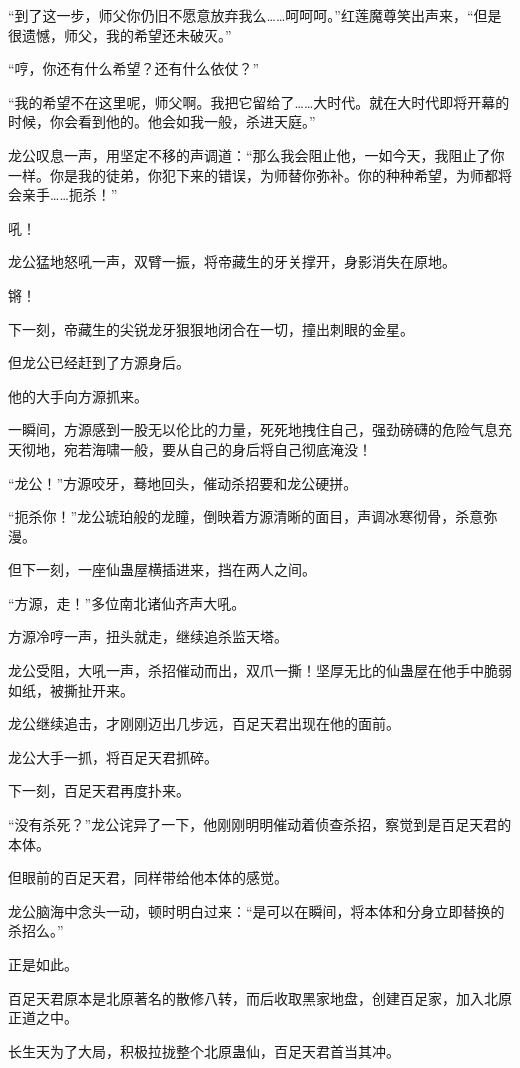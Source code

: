\begin{this_body}
“到了这一步，师父你仍旧不愿意放弃我么……呵呵呵。”红莲魔尊笑出声来，“但是很遗憾，师父，我的希望还未破灭。”

“哼，你还有什么希望？还有什么依仗？”

“我的希望不在这里呢，师父啊。我把它留给了……大时代。就在大时代即将开幕的时候，你会看到他的。他会如我一般，杀进天庭。”

龙公叹息一声，用坚定不移的声调道：“那么我会阻止他，一如今天，我阻止了你一样。你是我的徒弟，你犯下来的错误，为师替你弥补。你的种种希望，为师都将会亲手……扼杀！”

吼！

龙公猛地怒吼一声，双臂一振，将帝藏生的牙关撑开，身影消失在原地。

锵！

下一刻，帝藏生的尖锐龙牙狠狠地闭合在一切，撞出刺眼的金星。

但龙公已经赶到了方源身后。

他的大手向方源抓来。

一瞬间，方源感到一股无以伦比的力量，死死地拽住自己，强劲磅礴的危险气息充天彻地，宛若海啸一般，要从自己的身后将自己彻底淹没！

“龙公！”方源咬牙，蓦地回头，催动杀招要和龙公硬拼。

“扼杀你！”龙公琥珀般的龙瞳，倒映着方源清晰的面目，声调冰寒彻骨，杀意弥漫。

但下一刻，一座仙蛊屋横插进来，挡在两人之间。

“方源，走！”多位南北诸仙齐声大吼。

方源冷哼一声，扭头就走，继续追杀监天塔。

龙公受阻，大吼一声，杀招催动而出，双爪一撕！坚厚无比的仙蛊屋在他手中脆弱如纸，被撕扯开来。

龙公继续追击，才刚刚迈出几步远，百足天君出现在他的面前。

龙公大手一抓，将百足天君抓碎。

下一刻，百足天君再度扑来。

“没有杀死？”龙公诧异了一下，他刚刚明明催动着侦查杀招，察觉到是百足天君的本体。

但眼前的百足天君，同样带给他本体的感觉。

龙公脑海中念头一动，顿时明白过来：“是可以在瞬间，将本体和分身立即替换的杀招么。”

正是如此。

百足天君原本是北原著名的散修八转，而后收取黑家地盘，创建百足家，加入北原正道之中。

长生天为了大局，积极拉拢整个北原蛊仙，百足天君首当其冲。


\end{this_body}
